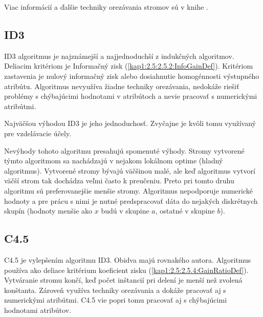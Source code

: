 Viac informácií a ďalšie techniky orezávania stromov sú v knihe \cite[s. 72]{kap1-DecisionTree}.


\subsection{ID3}\label{kap1:2.7:2.7.3:ID3}
ID3 algoritmus je najznámejší a najjednoduchší z indukčných algoritmov. Deliacim kritériom je Informačný zisk (\ref{kap1:2.5:2.5.2:InfoGainDef}). Kritériom zastavenia je nulový informačný zisk alebo dosiahnutie homogénnosti výstupného atribútu. Algoritmus nevyužíva žiadne techniky orezávania, nedokáže riešiť problémy s chýbajúcimi hodnotami v atribútoch a nevie pracovať s numerickými atribútmi.

Najväčšou výhodou ID3 je jeho jednoduchosť. Zvyčajne je kvôli tomu využívaný pre vzdelávacie účely. 

Nevýhody tohoto algoritmu presahujú spomenuté výhody. Stromy vytvorené týmto algoritmom sa nachádzajú v nejakom lokálnom optime (hladný algoritmus).
Vytvorené stromy bývajú väčšinou malé, ale keď algoritmus vytvorí väčší strom tak dochádza veľmi často k preučeniu. Preto pri tomto druhu algoritmu sú preferovanejšie menšie stromy. Algoritmus nepodporuje numerické hodnoty a pre prácu s nimi je nutné predspracovať dáta do nejakých diskrétnych skupín (hodnoty menšie ako $x$ budú v skupine $a$, ostatné v skupine $b$).
\subsection{C4.5}\label{kap1:2.7:2.7.4:C4.5}
C4.5 je vylepšením algoritmu ID3. Obidva majú rovnakého autora. Algoritmus používa ako deliace kritérium koeficient zisku (\ref{kap1:2.5:2.5.4:GainRatioDef}). Vytváranie stromu končí, keď počet inštancií pri delení je menší než zvolená konštanta. Zároveň využíva techniky orezávania a dokáže pracovať aj s numerickými atribútmi. C4.5 vie popri tomu  pracovať aj s chýbajúcimi hodnotami atribútov.

